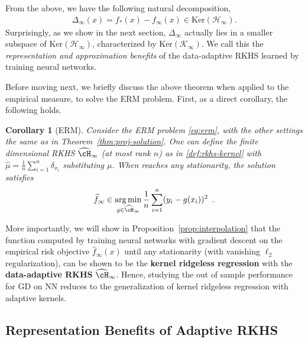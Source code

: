 \documentclass[11pt]{article}
\numberwithin{equation}{section}
\newtheorem{corollary}{Corollary}[section]
\def\argmin{\operatornamewithlimits{arg\,min}}
\begin{document}
    
    From the above, we have the following natural decomposition, 
    \begin{align}\label{eq:null-rkhs}
        \Delta_\infty(x) = f_*(x) - f_{\infty}(x) \in \text{Ker}(\mathcal{H}_\infty).
    \end{align}
    Surprisingly, as we show in the next section, $\Delta_\infty$ actually lies in a smaller subspace of $\text{Ker}(\mathcal{H}_\infty)$, characterized by $\text{Ker}(\mathcal{K}_\infty)$. We call this the \textit{representation and approximation benefits} of the data-adaptive RKHS learned by training neural networks. 

    Before moving next, we briefly discuss the above theorem when applied to the empirical measure, to solve the ERM problem. First, as a direct corollary, the following holds.
    \begin{corollary}[ERM]
        \label{cor:proj-solution}
        Consider the ERM problem \eqref{eq:erm}, with the other settings the same as in Theorem~\ref{thm:proj-solution}. One can define the finite dimensional RKHS $\widehat{\cH}_\infty$ (at most rank $n$) as in \eqref{def:rkhs-kernel} with $\widehat{\mu}=\frac{1}{n}\sum_{i=1}^n \delta_{x_i}$ substituting $\mu$. When reaches any stationarity, the solution satisfies
        \begin{align*}
            \widehat{f}_{\infty} \in \argmin_{g\in \widehat{\cH}_\infty} \frac{1}{n}\sum_{i=1}^n (y_i - g(x_i))^2 \enspace.
        \end{align*}
    \end{corollary}
    More importantly, we will show in Proposition~\ref{prop:interpolation} that the function computed by training neural networks with gradient descent on the empirical risk objective $\widehat{f}_{\infty}(x)$ until any stationarity (with vanishing $\ell_2$ regularization), can be shown to be the \textbf{kernel ridgeless regression} with the \textbf{data-adaptive RKHS} $\widehat{\cH}_{\infty}$. Hence, studying the out of sample performance for GD on NN reduces to the generalization of kernel ridgeless regression with adaptive kernels.
    
    
    


    




\subsection{Representation Benefits of Adaptive RKHS}
\end{document}
